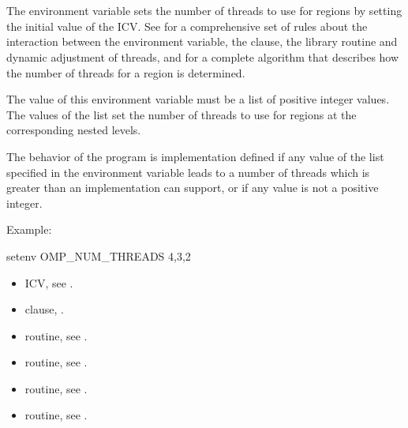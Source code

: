 \section{}
\label{sec:OMP_NUM_THREADS}
The  environment variable sets the number of threads to use for 
 regions by setting the initial value of the  ICV. See 
 for a comprehensive set of rules about the interaction between the 
 environment variable, the  clause, the 
 library routine and dynamic adjustment of threads, and 
for a complete algorithm that describes how the number of 
threads for a  region is determined.

The value of this environment variable must be a list of positive integer values. The 
values of the list set the number of threads to use for  regions at the 
corresponding nested levels.

The behavior of the program is implementation defined if any value of the list specified 
in the  environment variable leads to a number of threads which is 
greater than an implementation can support, or if any value is not a positive integer.

Example:
\begin{boxedcode}
setenv OMP\_NUM\_THREADS 4,3,2
\end{boxedcode}

\crossreferences
\begin{itemize}
\item {} ICV, see .

\item {} clause, .

\item {} routine, see .

\item {} routine, see .

\item {} routine, see .

\item {} routine, see .
\end{itemize}










